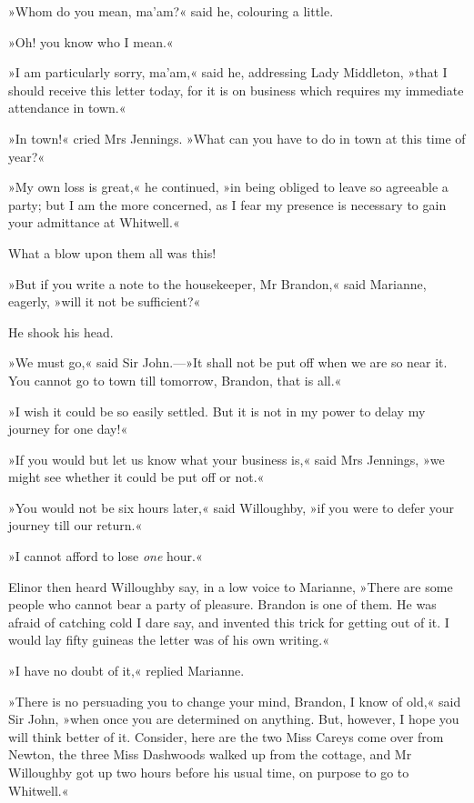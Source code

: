 »Whom do you mean, ma’am?« said he, colouring a little.

»Oh! you know who I mean.«

»I am particularly sorry, ma’am,« said he, addressing Lady Middleton, »that I should receive this letter today, for it is on business which requires my immediate attendance in town.«

»In town!« cried Mrs Jennings. »What can you have to do in town at this time of year?«

»My own loss is great,« he continued, »in being obliged to leave so agreeable a party; but I am the more concerned, as I fear my presence is necessary to gain your admittance at Whitwell.«

What a blow upon them all was this!

»But if you write a note to the housekeeper, Mr Brandon,« said Marianne, eagerly, »will it not be sufficient?«

He shook his head.

»We must go,« said Sir John.—»It shall not be put off when we are so near it. You cannot go to town till tomorrow, Brandon, that is all.«

»I wish it could be so easily settled. But it is not in my power to delay my journey for one day!«

»If you would but let us know what your business is,« said Mrs Jennings, »we might see whether it could be put off or not.«

»You would not be six hours later,« said Willoughby, »if you were to defer your journey till our return.«

»I cannot afford to lose \textit{one} hour.«

Elinor then heard Willoughby say, in a low voice to Marianne, »There are some people who cannot bear a party of pleasure. Brandon is one of them. He was afraid of catching cold I dare say, and invented this trick for getting out of it. I would lay fifty guineas the letter was of his own writing.«

»I have no doubt of it,« replied Marianne.

»There is no persuading you to change your mind, Brandon, I know of old,« said Sir John, »when once you are determined on anything. But, however, I hope you will think better of it. Consider, here are the two Miss Careys come over from Newton, the three Miss Dashwoods walked up from the cottage, and Mr Willoughby got up two hours before his usual time, on purpose to go to Whitwell.«

